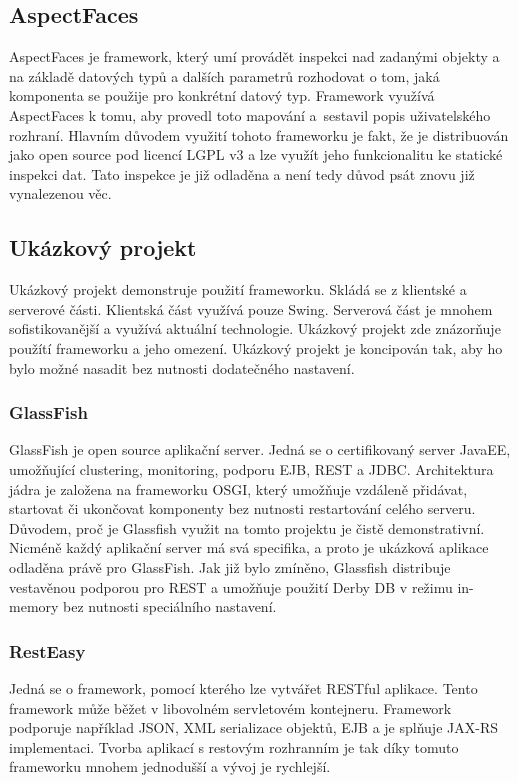 \subsection{AspectFaces}
AspectFaces je framework, který umí provádět inspekci nad zadanými objekty a na základě datových typů a dalších parametrů rozhodovat o tom, jaká komponenta se použije pro konkrétní datový typ. Framework využívá AspectFaces k tomu, aby provedl toto mapování a~sestavil popis uživatelského rozhraní. Hlavním důvodem využití tohoto frameworku je fakt, že je distribuován jako open source pod licencí LGPL v3 a lze využít jeho funkcionalitu ke statické inspekci dat. Tato inspekce je již odladěna a není tedy důvod psát znovu již vynalezenou věc. 
\subsection{Ukázkový projekt}
Ukázkový projekt demonstruje použití frameworku. Skládá se z klientské a serverové části. Klientská část využívá pouze Swing. Serverová část je mnohem sofistikovanější a využívá aktuální technologie. Ukázkový projekt zde znázorňuje použítí frameworku a jeho omezení. Ukázkový projekt je koncipován tak, aby ho bylo možné nasadit bez nutnosti dodatečného nastavení.
\subsubsection{GlassFish}
GlassFish \cite{glassfish} je open source aplikační server. Jedná se o certifikovaný server JavaEE, umožňující clustering, monitoring, podporu EJB, REST a JDBC. Architektura jádra je založena na frameworku OSGI, který umožňuje vzdáleně přidávat, startovat či ukončovat komponenty bez nutnosti restartování celého serveru. Důvodem, proč je Glassfish využit na tomto projektu je čistě demonstrativní. Nicméně každý aplikační server má svá specifika, a proto je ukázková aplikace odladěna právě pro GlassFish. Jak již bylo zmíněno, Glassfish distribuje vestavěnou podporou pro REST a umožňuje použití Derby DB v režimu in-memory bez nutnosti speciálního nastavení.
\subsubsection{RestEasy}
Jedná se o framework, pomocí kterého lze vytvářet RESTful aplikace. Tento framework může běžet v libovolném servletovém kontejneru. Framework podporuje například JSON, XML serializace objektů, EJB a je splňuje JAX-RS implementaci. Tvorba aplikací s restovým rozhranním je tak díky tomuto frameworku mnohem jednodušší a vývoj je rychlejší. 

